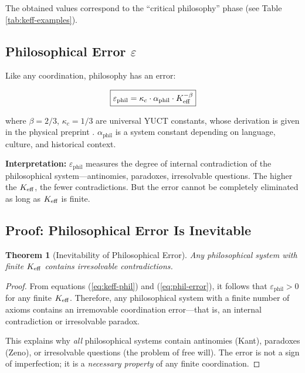 \documentclass[12pt,a4paper]{article}
\newcommand{\kappac}{\kappa_c}
\newcommand{\eps}{\varepsilon}
\newcommand{\betaf}{\beta}
\newtheorem{theorem}{Theorem}[section]
\begin{document}
	The obtained values correspond to the ``critical philosophy'' phase (see Table \ref{tab:keff-examples}).
	
	
	\subsection{Philosophical Error \texorpdfstring{\(\eps\)}{epsilon}}
	
	Like any coordination, philosophy has an error:
	
	\begin{equation}
		\boxed{
			\eps_{\text{phil}} = \kappac \cdot \alpha_{\text{phil}} \cdot \Keff^{-\betaf}
		}
		\label{eq:phil-error}
	\end{equation}
	
	where \(\betaf = 2/3\), \(\kappac = 1/3\) are universal YUCT constants, whose derivation is given in the physical preprint \cite{Yakushev2026b}. \(\alpha_{\text{phil}}\) is a system constant depending on language, culture, and historical context.
	
	\textbf{Interpretation:} \(\eps_{\text{phil}}\) measures the degree of internal contradiction of the philosophical system—antinomies, paradoxes, irresolvable questions. The higher the \(\Keff\), the fewer contradictions. But the error cannot be completely eliminated as long as \(\Keff\) is finite.
	
	\subsection{Proof: Philosophical Error Is Inevitable}
	
	\begin{theorem}[Inevitability of Philosophical Error]
		Any philosophical system with finite \(\Keff\) contains irresolvable contradictions.
	\end{theorem}
	
	\begin{proof}
		From equations (\ref{eq:keff-phil}) and (\ref{eq:phil-error}), it follows that \(\eps_{\text{phil}} > 0\) for any finite \(\Keff\). Therefore, any philosophical system with a finite number of axioms contains an irremovable coordination error—that is, an internal contradiction or irresolvable paradox.
		
		This explains why \emph{all} philosophical systems contain antinomies (Kant), paradoxes (Zeno), or irresolvable questions (the problem of free will). The error is not a sign of imperfection; it is a \emph{necessary property} of any finite coordination.
	\end{proof}
	
\end{document}

